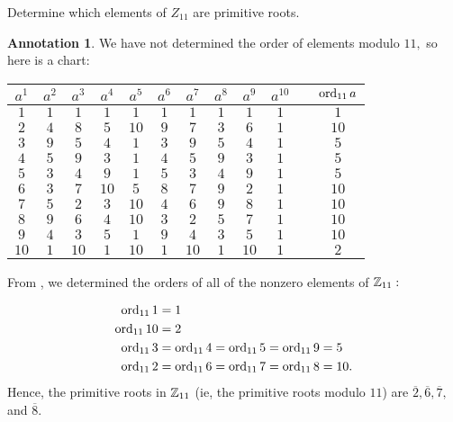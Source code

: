 \documentclass[letterpaper, 11 pt]{ximera}
\theoremstyle{definition}
\newtheorem*{annotation}{Annotation}
\begin{document}
\begin{example}\label{ex:prime_roots_11}
    Determine which elements of $Z_{11}$ are primitive roots.

    
    \begin{annotation}
        We have not determined the order of elements modulo $11,$ so here is a chart:
        \begin{center}
            \begin{tabular}{|c|c|c|c|c|c|c|c|c|c|cc|}
                $a^1$ & $a^2$ & $a^3$ & $a^4$ & $a^5$ & $a^6$ & $a^7$ & $a^8$ & $a^9$ & $a^{10} $&& $\operatorname{ord}_{11}a$\\\hline
                $1$ & $1$ & $1$ & $1$ & $1$ & $1$ & $1$ & $1$ & $1$ & $1$  && $1$\\
                $2$ & $4$ & $8$ & $5$ & $10$ & $9$ & $7$ & $3$ & $6$ & $1$ && $10$\\
                $3$ & $9$ & $5$ & $4$ & $1$ & $3$ & $9$ & $5$ & $4$ & $1$ && $5$\\
                $4$ & $5$ & $9$ & $3$ & $1$ & $4$ & $5$ & $9$ & $3$ & $1$  && $5$\\
                $5$ & $3$ & $4$ & $9$ & $1$ & $5$ & $3$ & $4$ & $9$ & $1$ && $5$\\
                $6$ & $3$ & $7$ & $10$ & $5$ & $8$ & $7$ & $9$ & $2$ & $1$ && $10$\\
                $7$ & $5$ & $2$ & $3$ & $10$ & $4$ & $6$ & $9$ & $8$ & $1$ && $10$\\
                $8$ & $9$ & $6$ & $4$ & $10$ & $3$ & $2$ & $5$ & $7$ & $1$ && $10$\\
                $9$ & $4$ & $3$ & $5$ & $1$ & $9$ & $4$ & $3$ & $5$ & $1$  && $10$\\
                $10$ & $1$ & $10$ & $1$ & $10$ & $1$ & $10$ & $1$ & $10$ & $1$  && $2$\\
            \end{tabular}
            \label{table:exp_mod11}
            \end{center}
    \end{annotation}
    \begin{solution}
        From , we determined the orders of all of the nonzero elements of $\mathbb Z_{11}:$

        \begin{align*}
            \operatorname{ord}_{11} 1&=1 \\
            \operatorname{ord}_{11} 10&=2 \\
            \operatorname{ord}_{11} 3&=\operatorname{ord}_{11} 4=\operatorname{ord}_{11} 5=\operatorname{ord}_{11} 9=5\\
            \operatorname{ord}_{11} 2&=\operatorname{ord}_{11} 6=\operatorname{ord}_{11} 7=\operatorname{ord}_{11} 8=10.
        \end{align*}
        Hence, the primitive roots in $\mathbb Z_{11}$ (ie, the primitive roots modulo $11$) are $\overline{2},\overline{6},\overline{7},$ and $\overline{8}.$
    \end{solution}
\end{example}
\end{document}
